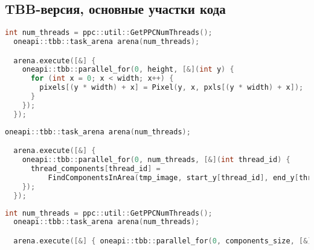 \documentclass[12pt]{article}
\begin{document}
\subsection{TBB-версия, основные участки кода}
\label{appendix:tbb_1}
\begin{lstlisting}[language=C++, caption={TBB-версия, Создание объекта Image в конструкторе Image::Image()}]
int num_threads = ppc::util::GetPPCNumThreads();
  oneapi::tbb::task_arena arena(num_threads);

  arena.execute([&] {
    oneapi::tbb::parallel_for(0, height, [&](int y) {
      for (int x = 0; x < width; x++) {
        pixels[(y * width) + x] = Pixel(y, x, pxls[(y * width) + x]);
      }
    });
  });
\end{lstlisting}
\label{appendix:tbb_2}
\begin{lstlisting}[language=C++, caption={TBB-версия, Поиск компонент по "полосам" изображения в функции FindComponentsTBB()}]
oneapi::tbb::task_arena arena(num_threads);

  arena.execute([&] {
    oneapi::tbb::parallel_for(0, num_threads, [&](int thread_id) {
      thread_components[thread_id] =
          FindComponentsInArea(tmp_image, start_y[thread_id], end_y[thread_id], index_offset[thread_id]);
    });
  });
\end{lstlisting}
\label{appendix:tbb_3}
\begin{lstlisting}[language=C++, caption={TBB-версия, Построение оболочки для каждой из компонент в функции QuickHullAllTBB()}]
  int num_threads = ppc::util::GetPPCNumThreads();
  oneapi::tbb::task_arena arena(num_threads);

  arena.execute([&] { oneapi::tbb::parallel_for(0, components_size, [&](int i) { hulls[i] = QuickHull(components[i]); }); });
\end{lstlisting}

\newpage
\end{document}
